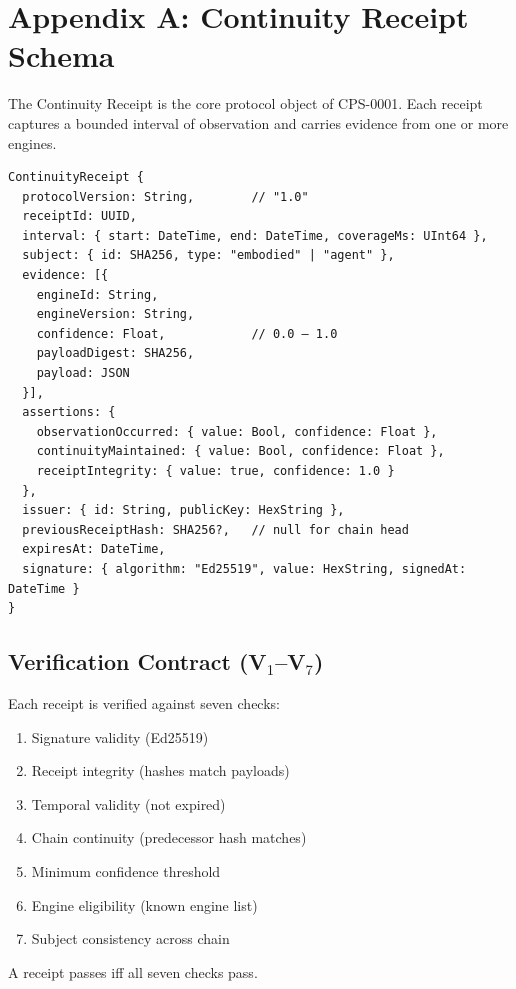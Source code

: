 \section*{Appendix A: Continuity Receipt Schema}
\label{app:schema}

The Continuity Receipt is the core protocol object of CPS-0001. Each receipt captures a bounded interval of observation and carries evidence from one or more engines.

\begin{verbatim}
ContinuityReceipt {
  protocolVersion: String,        // "1.0"
  receiptId: UUID,
  interval: { start: DateTime, end: DateTime, coverageMs: UInt64 },
  subject: { id: SHA256, type: "embodied" | "agent" },
  evidence: [{
    engineId: String,
    engineVersion: String,
    confidence: Float,            // 0.0 — 1.0
    payloadDigest: SHA256,
    payload: JSON
  }],
  assertions: {
    observationOccurred: { value: Bool, confidence: Float },
    continuityMaintained: { value: Bool, confidence: Float },
    receiptIntegrity: { value: true, confidence: 1.0 }
  },
  issuer: { id: String, publicKey: HexString },
  previousReceiptHash: SHA256?,   // null for chain head
  expiresAt: DateTime,
  signature: { algorithm: "Ed25519", value: HexString, signedAt: DateTime }
}
\end{verbatim}

\subsection*{Verification Contract (V$_1$–V$_7$)}

Each receipt is verified against seven checks:
\begin{enumerate}
\item[V$_1$] Signature validity (Ed25519)
\item[V$_2$] Receipt integrity (hashes match payloads)
\item[V$_3$] Temporal validity (not expired)
\item[V$_4$] Chain continuity (predecessor hash matches)
\item[V$_5$] Minimum confidence threshold
\item[V$_6$] Engine eligibility (known engine list)
\item[V$_7$] Subject consistency across chain
\end{enumerate}

A receipt passes iff all seven checks pass.

